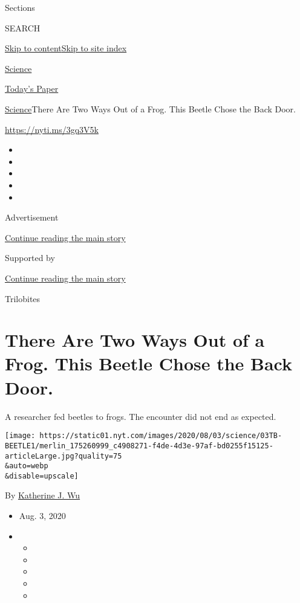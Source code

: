 Sections

SEARCH

\protect\hyperlink{site-content}{Skip to
content}\protect\hyperlink{site-index}{Skip to site index}

\href{https://www.nytimes.com/section/science}{Science}

\href{https://myaccount.nytimes.com/auth/login?response_type=cookie\&client_id=vi}{}

\href{https://www.nytimes.com/section/todayspaper}{Today's Paper}

\href{/section/science}{Science}\textbar{}There Are Two Ways Out of a
Frog. This Beetle Chose the Back Door.

\url{https://nyti.ms/3gq3V5k}

\begin{itemize}
\item
\item
\item
\item
\item
\end{itemize}

Advertisement

\protect\hyperlink{after-top}{Continue reading the main story}

Supported by

\protect\hyperlink{after-sponsor}{Continue reading the main story}

Trilobites

\hypertarget{there-are-two-ways-out-of-a-frog-this-beetle-chose-the-back-door}{%
\section{There Are Two Ways Out of a Frog. This Beetle Chose the Back
Door.}\label{there-are-two-ways-out-of-a-frog-this-beetle-chose-the-back-door}}

A researcher fed beetles to frogs. The encounter did not end as
expected.

\texttt{[image: https://static01.nyt.com/images/2020/08/03/science/03TB-BEETLE1/merlin\_175260999\_c4908271-f4de-4d3e-97af-bd0255f15125-articleLarge.jpg?quality=75\\\&auto=webp\\\&disable=upscale]}

By \href{https://www.nytimes.com/by/katherine-j--wu}{Katherine J. Wu}

\begin{itemize}
\item
  Aug. 3, 2020
\item
  \begin{itemize}
  \item
  \item
  \item
  \item
  \item
  \end{itemize}
\end{itemize}

